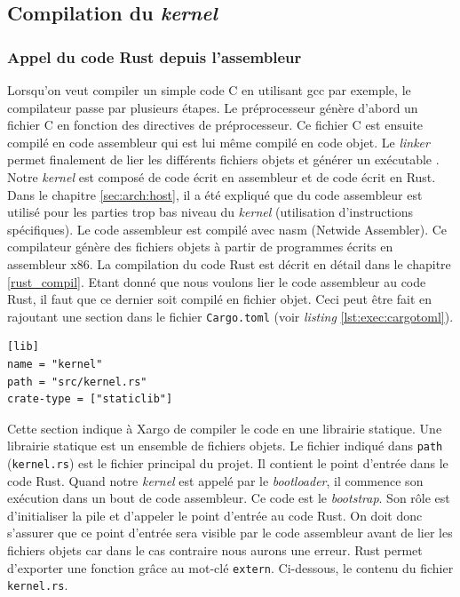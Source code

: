 
\subsection{Compilation du \textit{kernel}}
\subsubsection{Appel du code Rust depuis l'assembleur}
Lorsqu'on veut compiler un simple code C en utilisant \acrshort{gcc} par
exemple, le compilateur passe par plusieurs étapes. Le préprocesseur génère d'abord
un fichier C en fonction des directives de préprocesseur. Ce fichier C est ensuite
compilé en code assembleur qui est lui même compilé en code objet. Le \textit{linker}
permet finalement de lier les différents fichiers objets et générer un exécutable \cite{ref42}.
Notre \textit{kernel} est composé de code écrit en assembleur et de code écrit
en Rust. Dans le chapitre \ref{sec:arch:host}, il a été expliqué que du code assembleur
est utilisé pour les parties trop bas niveau du \textit{kernel} (utilisation d'instructions
spécifiques). Le code assembleur est compilé avec \acrshort{nasm} (Netwide Assembler).
Ce compilateur génère des fichiers objets à partir de programmes écrits en assembleur
x86. La compilation du code Rust est décrit en détail dans le chapitre \ref{rust_compil}.
Etant donné que nous voulons lier le code assembleur au code Rust, il faut que
ce dernier soit compilé en fichier objet. Ceci peut être fait en rajoutant une section
dans le fichier \texttt{Cargo.toml} (voir \textit{listing} \ref{lst:exec:cargotoml}).

\begin{code}
\begin{verbatim}
[lib]
name = "kernel"
path = "src/kernel.rs"
crate-type = ["staticlib"]
\end{verbatim}
\caption{Section \texttt{lib} du fichier \texttt{Cargo.toml}}
\label{lst:exec:cargotoml}
\end{code} \bigbreak

Cette section indique à Xargo de compiler le code en une librairie statique.
Une librairie statique est un ensemble de fichiers objets. Le fichier indiqué
dans \texttt{path} (\texttt{kernel.rs}) est le fichier principal
du projet. Il contient le point d'entrée dans le code Rust. Quand notre \textit{kernel}
est appelé par le \textit{bootloader}, il commence son exécution dans un bout de
code assembleur. Ce code est le \textit{bootstrap}. Son rôle est d'initialiser
la pile et d'appeler le point d'entrée au code Rust. On doit donc s'assurer que
ce point d'entrée sera visible par le code assembleur avant de lier les fichiers
objets car dans le cas contraire nous aurons une erreur. Rust permet d'exporter
une fonction grâce au mot-clé \texttt{extern}. Ci-dessous, le contenu
du fichier \texttt{kernel.rs}.

